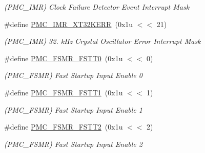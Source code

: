 \begin{DoxyCompactItemize}
\begin{DoxyCompactList}\small\item\em (P\+M\+C\+\_\+\+I\+MR) Clock Failure Detector Event Interrupt Mask \end{DoxyCompactList}\item 
\mbox{\label{group__SAME70__PMC_gac242edfc1b1b6849dedc4287484ae341}} 
\#define \mbox{\hyperlink{group__SAME70__PMC_gac242edfc1b1b6849dedc4287484ae341}{P\+M\+C\+\_\+\+I\+M\+R\+\_\+\+X\+T32\+K\+E\+RR}}~(0x1u $<$$<$ 21)
\begin{DoxyCompactList}\small\item\em (P\+M\+C\+\_\+\+I\+MR) 32. k\+Hz Crystal Oscillator Error Interrupt Mask \end{DoxyCompactList}\item 
\mbox{\label{group__SAME70__PMC_ga12706f73e66ce05cbb86fcc4a90ffcb2}} 
\#define \mbox{\hyperlink{group__SAME70__PMC_ga12706f73e66ce05cbb86fcc4a90ffcb2}{P\+M\+C\+\_\+\+F\+S\+M\+R\+\_\+\+F\+S\+T\+T0}}~(0x1u $<$$<$ 0)
\begin{DoxyCompactList}\small\item\em (P\+M\+C\+\_\+\+F\+S\+MR) Fast Startup Input Enable 0 \end{DoxyCompactList}\item 
\mbox{\label{group__SAME70__PMC_ga9ea2a7647ca3147fd349b666b3da4a3a}} 
\#define \mbox{\hyperlink{group__SAME70__PMC_ga9ea2a7647ca3147fd349b666b3da4a3a}{P\+M\+C\+\_\+\+F\+S\+M\+R\+\_\+\+F\+S\+T\+T1}}~(0x1u $<$$<$ 1)
\begin{DoxyCompactList}\small\item\em (P\+M\+C\+\_\+\+F\+S\+MR) Fast Startup Input Enable 1 \end{DoxyCompactList}\item 
\mbox{\label{group__SAME70__PMC_gabfc48683196af6e41928ef97958820bc}} 
\#define \mbox{\hyperlink{group__SAME70__PMC_gabfc48683196af6e41928ef97958820bc}{P\+M\+C\+\_\+\+F\+S\+M\+R\+\_\+\+F\+S\+T\+T2}}~(0x1u $<$$<$ 2)
\begin{DoxyCompactList}\small\item\em (P\+M\+C\+\_\+\+F\+S\+MR) Fast Startup Input Enable 2 \end{DoxyCompactList}\item 
\mbox{\label{group__SAME70__PMC_ga209ebf830fe0d38dec72a4157c8c0285}} 

\end{DoxyCompactItemize}
